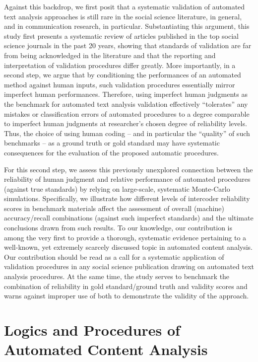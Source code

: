 \documentclass[man, 12pt, a4paper, nolmodern, noextraspace]{apa6}
\begin{document}
    Against this backdrop, we first posit that a systematic validation of automated text analysis approaches is still rare in the social science literature, in general, and in communication research, in particular. Substantiating this argument, this study first presents a systematic review of articles published in the top social science journals in the past 20 years, showing that standards of validation are far from being acknowledged in the literature and that the reporting and interpretation of validation procedures differ greatly. More importantly, in a second step, we argue that by conditioning the performances of an automated method against human inputs, such validation procedures essentially mirror imperfect human performances. Therefore, using imperfect human judgments as the benchmark for automated text analysis validation effectively \enquote{tolerates} any mistakes or classification errors of automated procedures to a degree comparable to imperfect human judgments at researcher’s chosen degree of reliability levels. Thus, the choice of using human coding – and in particular the \enquote{quality} of such benchmarks – as a ground truth or gold standard may have systematic consequences for the evaluation of the proposed automatic procedures. 

    For this second step, we assess this previously unexplored connection between the reliability of human judgment and relative performance of automated procedures (against true standards) by relying on large-scale, systematic Monte-Carlo simulations. Specifically, we illustrate how different levels of intercoder reliability scores in benchmark materials affect the assessment of overall (machine) accuracy/recall combinations (against such imperfect standards) and the ultimate conclusions drawn from such results. To our knowledge, our contribution is among the very first to provide a thorough, systematic evidence pertaining to a well-known, yet extremely scarcely discussed topic in automated content analysis. Our contribution should be read as a call for a systematic application of validation procedures in any social science publication drawing on automated text analysis procedures. At the same time, the study serves to benchmark the combination of reliability in gold standard/ground truth and validity scores and warns against improper use of both to demonstrate the validity of the approach. 
    
\section{Logics and Procedures of Automated Content Analysis}
\end{document}
